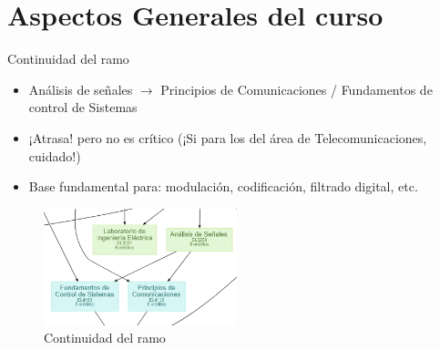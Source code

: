 \documentclass[
    10pt,
    aspectratio=169,
    xcolor={dvipsnames},
    spanish,
    ]{beamer}
\begin{document}
\section{Aspectos Generales del curso}


\begin{frame}{Continuidad del ramo}
  \begin{itemize}
    \item Análisis de señales $\rightarrow$ Principios de Comunicaciones / Fundamentos de control de Sistemas
    \item ¡Atrasa! pero no es crítico (¡Si para los del área de Telecomunicaciones, cuidado!)
    \item Base fundamental para: modulación, codificación, filtrado digital, etc.
  \end{itemize}
  \begin{figure}
    \centering
    \includegraphics[width=0.5\textwidth]{Figura_1.png}
    \caption{Continuidad del ramo}
  \end{figure}
\end{frame}
\end{document}
